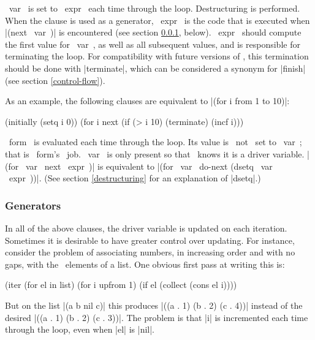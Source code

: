 \begin{clauses}


~var~ is set to ~expr~ each time through the loop.  Destructuring is
performed.  When the clause is used as a generator, ~expr~ is the code
that is executed when |(next ~var~)| is 
encountered (see section \ref{generators}, below).
~expr~ should compute the first value for ~var~, as well
as all subsequent values, and is responsible for terminating the loop.
For compatibility with future versions of \iter, this termination
should be done with |terminate|, which can be
considered a synonym for |finish| (see section \ref{control-flow}).

\cpar As an example, the following clauses are equivalent to |(for
i from 1 to 10)|:
\begin{program}
(initially (setq i 0))
(for i next (if (> i 10) (terminate) (incf i)))
\end{program}

~form~ is evaluated each time through the loop.  Its value is ~not~
set to ~var~; that is ~form's~ job. ~var~ is only present so that
\iter\ knows it is a driver variable.  \linebreak |(for ~var~ next
~expr~)| is equivalent to |(for ~var~ do-next (dsetq ~var~ ~expr~))|.
(See section \ref{destructuring} for an explanation of |dsetq|.) 

\end{clauses}

\subsubsection{Generators}
\label{generators}

In all of the above clauses, the driver variable is updated on each
iteration.
Sometimes it is desirable to have greater control over updating.  
For instance, consider the problem of associating numbers, in
increasing order and with no gaps, with the
\nonnil\ elements of a list.  One obvious first pass at writing this is:

\begin{program}
(iter (for el in list)
      (for i upfrom 1)
      (if el (collect (cons el i))))
\end{program}
But on the list |(a b nil c)| this produces |((a . 1) (b . 2) (c .
4))| instead of the desired |((a . 1) (b . 2) (c . 3))|.  The problem
is that |i| is incremented each time through the loop, even when |el|
is |nil|.  

